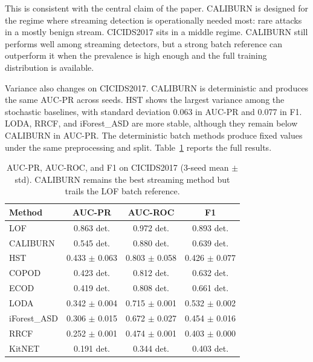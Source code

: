 \documentclass[preprint,12pt,authoryear]{elsarticle}
\newcommand{\caliburn}{CALIBURN}
\begin{document}
This is consistent with the central claim of the paper. \caliburn{} is designed for the regime where streaming detection is operationally needed most: rare attacks in a mostly benign stream. CICIDS2017 sits in a middle regime. \caliburn{} still performs well among streaming detectors, but a strong batch reference can outperform it when the prevalence is high enough and the full training distribution is available.

Variance also changes on CICIDS2017. \caliburn{} is deterministic and produces the same AUC-PR across seeds. HST shows the largest variance among the stochastic baselines, with standard deviation 0.063 in AUC-PR and 0.077 in F1. LODA, RRCF, and iForest\_ASD are more stable, although they remain below \caliburn{} in AUC-PR. The deterministic batch methods produce fixed values under the same preprocessing and split. Table~\ref{tab:cicids-results} reports the full results.

\begin{table}[ht]
\centering
\caption{AUC-PR, AUC-ROC, and F1 on CICIDS2017 (3-seed mean $\pm$ std). \caliburn{} remains the best streaming method but trails the LOF batch reference.}
\label{tab:cicids-results}
\begin{tabular}{lccc}
\toprule
Method        & AUC-PR              & AUC-ROC             & F1                  \\
\midrule
LOF           & 0.863 det.          & 0.972 det.          & 0.893 det.          \\
\caliburn{}   & 0.545 det.          & 0.880 det.          & 0.639 det.          \\
HST           & 0.433 $\pm$ 0.063   & 0.803 $\pm$ 0.058   & 0.426 $\pm$ 0.077   \\
COPOD         & 0.423 det.          & 0.812 det.          & 0.632 det.          \\
ECOD          & 0.419 det.          & 0.808 det.          & 0.661 det.          \\
LODA          & 0.342 $\pm$ 0.004   & 0.715 $\pm$ 0.001   & 0.532 $\pm$ 0.002   \\
iForest\_ASD  & 0.306 $\pm$ 0.015   & 0.672 $\pm$ 0.027   & 0.454 $\pm$ 0.016   \\
RRCF          & 0.252 $\pm$ 0.001   & 0.474 $\pm$ 0.001   & 0.403 $\pm$ 0.000   \\
KitNET        & 0.191 det.          & 0.344 det.          & 0.403 det.          \\
\bottomrule
\end{tabular}
\end{table}
\end{document}

